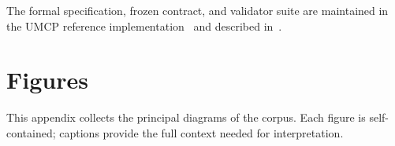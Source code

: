 \documentclass[
  aps,
  prd,
  twocolumn,
  superscriptaddress,
  nofootinbib,
  floatfix
]{revtex4-2}
\begin{document}
\begin{acknowledgments}
The formal specification, frozen contract, and validator suite are
maintained in the UMCP reference implementation~\cite{umcpmetadatarepo}
and described in~\cite{paulus2025umcp,paulus2025episteme}.
\end{acknowledgments}

\appendix
\onecolumngrid
\section{Figures}\label{app:figures}

This appendix collects the principal diagrams of the corpus.
Each figure is self-contained; captions provide the full
context needed for interpretation.
\vspace{-4pt}
\end{document}
